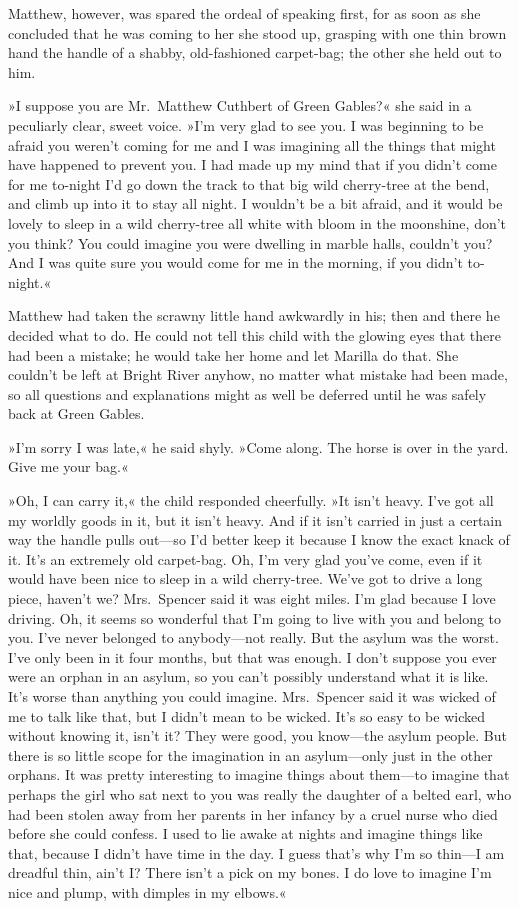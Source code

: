 Matthew, however, was spared the ordeal of speaking first, for as soon as she concluded that he was coming to her she stood up, grasping with one thin brown hand the handle of a shabby, old-fashioned carpet-bag; the other she held out to him.

»I suppose you are Mr.~Matthew Cuthbert of Green Gables?« she said in a peculiarly clear, sweet voice. »I'm very glad to see you. I was beginning to be afraid you weren't coming for me and I was imagining all the things that might have happened to prevent you. I had made up my mind that if you didn't come for me to-night I'd go down the track to that big wild cherry-tree at the bend, and climb up into it to stay all night. I wouldn't be a bit afraid, and it would be lovely to sleep in a wild cherry-tree all white with bloom in the moonshine, don't you think? You could imagine you were dwelling in marble halls, couldn't you? And I was quite sure you would come for me in the morning, if you didn't to-night.«

Matthew had taken the scrawny little hand awkwardly in his; then and there he decided what to do. He could not tell this child with the glowing eyes that there had been a mistake; he would take her home and let Marilla do that. She couldn't be left at Bright River anyhow, no matter what mistake had been made, so all questions and explanations might as well be deferred until he was safely back at Green Gables.

»I'm sorry I was late,« he said shyly. »Come along. The horse is over in the yard. Give me your bag.«

»Oh, I can carry it,« the child responded cheerfully. »It isn't heavy. I've got all my worldly goods in it, but it isn't heavy. And if it isn't carried in just a certain way the handle pulls out—so I'd better keep it because I know the exact knack of it. It's an extremely old carpet-bag. Oh, I'm very glad you've come, even if it would have been nice to sleep in a wild cherry-tree. We've got to drive a long piece, haven't we? Mrs.~Spencer said it was eight miles. I'm glad because I love driving. Oh, it seems so wonderful that I'm going to live with you and belong to you. I've never belonged to anybody—not really. But the asylum was the worst. I've only been in it four months, but that was enough. I don't suppose you ever were an orphan in an asylum, so you can't possibly understand what it is like. It's worse than anything you could imagine. Mrs.~Spencer said it was wicked of me to talk like that, but I didn't mean to be wicked. It's so easy to be wicked without knowing it, isn't it? They were good, you know—the asylum people. But there is so little scope for the imagination in an asylum—only just in the other orphans. It was pretty interesting to imagine things about them—to imagine that perhaps the girl who sat next to you was really the daughter of a belted earl, who had been stolen away from her parents in her infancy by a cruel nurse who died before she could confess. I used to lie awake at nights and imagine things like that, because I didn't have time in the day. I guess that's why I'm so thin—I am dreadful thin, ain't I? There isn't a pick on my bones. I do love to imagine I'm nice and plump, with dimples in my elbows.«

